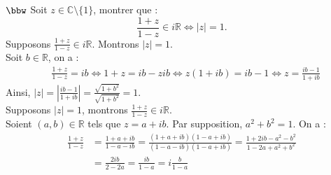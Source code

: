 \documentclass[11pt]{article}
\begin{document}
\begin{exercice}{$\bbw$}{}
    Soit $z \in \mathbb{C} \setminus \{1\}$, montrer que :
    \begin{equation*}
        \frac{1+z}{1-z} \in i\mathbb{R} \iff |z| = 1.
    \end{equation*}
    \tcblower
    Supposons $\frac{1+z}{1-z} \in i\mathbb{R}$. Montrons $|z|=1$.\\
    Soit $b\in\mathbb{R}$, on a :
    \begin{align*}
        &\frac{1+z}{1-z}=ib\iff1+z=ib-zib\iff z(1+ib)=ib-1\iff z=\frac{ib-1}{1+ib}
    \end{align*}
    Ainsi, $|z|=|\frac{ib-1}{1+ib}|=\frac{\sqrt{1+b^2}}{\sqrt{1+b^2}}=1$.\\
    Supposons $|z|=1$, montrons $\frac{1+z}{1-z} \in i\mathbb{R}$.\\
    Soient $(a,b)\in\mathbb{R}$ tels que $z=a+ib$. Par supposition, $a^2+b^2=1$. On a :
    \begin{align*}
        \frac{1+z}{1-z}&=\frac{1+a+ib}{1-a-ib}=\frac{(1+a+ib)(1-a+ib)}{(1-a-ib)(1-a+ib)}=\frac{1+2ib-a^2-b^2}{1-2a+a^2+b^2}\\
        &= \frac{2ib}{2-2a} = \frac{ib}{1-a}=i\frac{b}{1-a}
    \end{align*}
\end{exercice}
\end{document}
